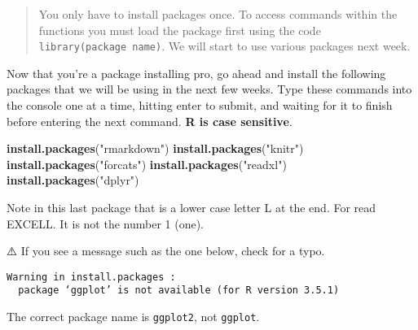 \documentclass[]{article}
\newenvironment{Shaded}{\begin{snugshade}}{\end{snugshade}}
\newcommand{\KeywordTok}[1]{\textcolor[rgb]{0.13,0.29,0.53}{\textbf{#1}}}
\newcommand{\NormalTok}[1]{#1}
\newcommand{\StringTok}[1]{\textcolor[rgb]{0.31,0.60,0.02}{#1}}
\begin{document}
\begin{quote}
You only have to install packages once. To access commands within the
functions you must load the package first using the code
\texttt{library(package\ name)}. We will start to use various packages
next week.
\end{quote}

Now that you're a package installing pro, go ahead and install the
following packages that we will be using in the next few weeks. Type
these commands into the console one at a time, hitting enter to submit,
and waiting for it to finish before entering the next command. \textbf{R
is case sensitive}.

\begin{Shaded}
\begin{Highlighting}[]
\KeywordTok{install.packages}\NormalTok{(}\StringTok{"rmarkdown"}\NormalTok{)}
\KeywordTok{install.packages}\NormalTok{(}\StringTok{"knitr"}\NormalTok{)}
\KeywordTok{install.packages}\NormalTok{(}\StringTok{"forcats"}\NormalTok{)}
\KeywordTok{install.packages}\NormalTok{(}\StringTok{"readxl"}\NormalTok{)}
\KeywordTok{install.packages}\NormalTok{(}\StringTok{"dplyr"}\NormalTok{)}
\end{Highlighting}
\end{Shaded}

Note in this last package that is a lower case letter L at the end. For
read EXCELL. It is not the number 1 (one).

⚠️ If you see a message such as the one below, check for a typo.

\begin{verbatim}
Warning in install.packages :
  package ‘ggplot’ is not available (for R version 3.5.1)
\end{verbatim}

The correct package name is \texttt{ggplot2}, not \texttt{ggplot}.
\end{document}
